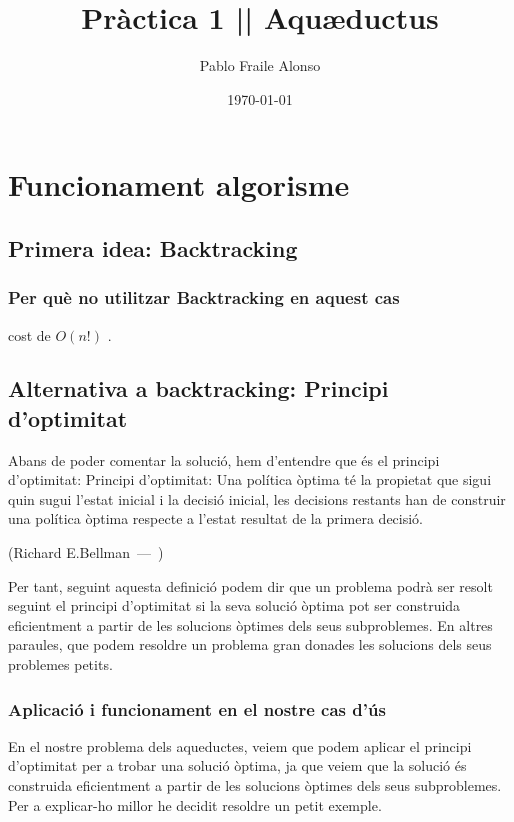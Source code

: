\documentclass[12pt, letterpaper]{article}
\title{\textbf{Pràctica 1 || Aquæductus}}
\author{Pablo Fraile Alonso}
\date{\today}
\let\oldquote\quote
\let\endoldquote\endquote
\renewenvironment{quote}[2][]
  {\if\relax\detokenize{#1}\relax
     \def\quoteauthor{#2}%
   \else
     \def\quoteauthor{#2~---~#1}%
   \fi
   \oldquote}
  {\par\nobreak\smallskip\hfill(\quoteauthor)%
   \endoldquote\addvspace{\bigskipamount}}
\begin{document}
\maketitle
\thispagestyle{empty}
\newpage
\tableofcontents
\listoffigures
\newpage

\section{Funcionament algorisme}

\subsection{Primera idea: Backtracking}

\subsubsection{Per què no utilitzar Backtracking en aquest cas}
cost de $O(n!)$ .

\newpage
\subsection{Alternativa a backtracking: Principi d'optimitat}
Abans de poder comentar la solució, hem d'entendre que és el principi d'optimitat: 
\begin{quote}{Richard E.Bellman} Principi d'optimitat: Una política òptima té la propietat que sigui quin sugui l'estat inicial i la decisió inicial, les decisions restants han de construir una política òptima respecte a l'estat resultat de la primera decisió.
\end{quote}

Per tant, seguint aquesta definició podem dir que un problema podrà ser resolt seguint el principi d'optimitat si la seva solució òptima pot ser construida eficientment a partir de les solucions òptimes dels seus subproblemes. En altres paraules, que podem resoldre un problema gran donades les solucions dels seus problemes petits.

\subsubsection{Aplicació i funcionament en el nostre cas d'ús}
\label{seccio:funcionament}
En el nostre problema dels aqueductes, veiem que podem aplicar el principi d'optimitat per a trobar una solució òptima, ja que veiem que la solució és construida eficientment a partir de les solucions òptimes dels seus subproblemes. Per a explicar-ho millor he decidit resoldre un petit exemple.
\end{document}
